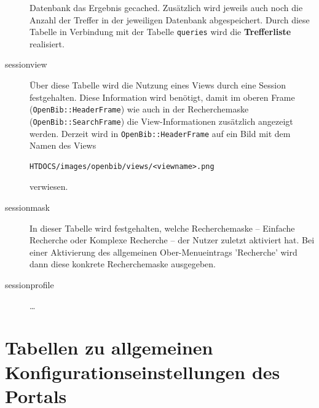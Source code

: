 \documentclass[11pt, twoside, a4paper, BCOR8mm, DIV12, bibtotoc,idxtotoc]{scrbook}
\begin{document}
\begin{description}
  Datenbank das Ergebnis gecached. Zusätzlich wird jeweils auch noch
  die Anzahl der Treffer in der jeweiligen Datenbank
  ab\-ge\-spei\-chert. Durch diese Tabelle in Verbindung mit der Tabelle
  \texttt{queries} wird die \textbf{Trefferliste} realisiert.
\item[sessionview] Über diese Tabelle wird die Nutzung eines Views
  durch eine Session festgehalten. Diese Information wird benötigt,
  damit im oberen Frame (\texttt{OpenBib::HeaderFrame}) wie auch in der
  Recherchemaske (\texttt{OpenBib::SearchFrame}) die View-Informationen
  zusätzlich angezeigt werden. Derzeit wird in \texttt{OpenBib::HeaderFrame}
  auf ein Bild mit dem Namen des Views
\begin{verbatim}
HTDOCS/images/openbib/views/<viewname>.png
\end{verbatim}

  verwiesen.
\item[sessionmask] In dieser Tabelle wird festgehalten, welche
  Recherchemaske -- Einfache Recherche oder Komplexe Recherche -- der
  Nutzer zuletzt aktiviert hat. Bei einer Aktivierung des allgemeinen
  Ober-Menueintrags 'Recherche' wird dann diese konkrete
  Recherchemaske aus\-ge\-ge\-ben.
\item[sessionprofile] \dots
\end{description}

\section{Tabellen zu allgemeinen Konfigurationseinstellungen des Portals}
\end{document}
